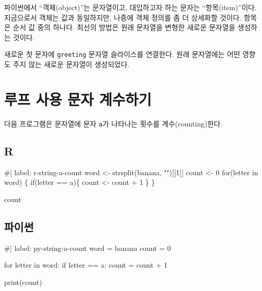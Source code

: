\documentclass[
  letterpaper,
]{book}
\newenvironment{Shaded}{\begin{snugshade}}{\end{snugshade}}
\newcommand{\NormalTok}[1]{\textcolor[rgb]{0.00,0.23,0.31}{#1}}
\begin{document}
파이썬에서 ``객체(object)''는 문자열이고, 대입하고자 하는 문자는
``항목(item)''이다. 지금으로서 객체는 값과 동일하지만, 나중에 객체
정의를 좀 더 상세화할 것이다. 항목은 순서 값 중의 하나다. 최선의 방법은
원래 문자열을 변형한 새로운 문자열을 생성하는 것이다. 
  

새로운 첫 문자에 \texttt{greeting} 문자열 슬라이스를 연결한다. 원래
문자열에는 어떤 영향도 주지 않는 새로운 문자열이 생성되었다.

\section{루프 사용 문자 계수하기}\label{r-string-count}

  

다음 프로그램은 문자열에 문자 \texttt{a}가 나타나는 횟수를
계수(counting)한다.

\subsection{R}

\begin{Shaded}
\begin{Highlighting}[]
\NormalTok{\#| label:  r{-}string{-}a{-}count}
\NormalTok{word \textless{}{-} strsplit(\textquotesingle{}banana\textquotesingle{}, "")[[1]]}
\NormalTok{count \textless{}{-} 0}
\NormalTok{for(letter in word) \{}
\NormalTok{  if(letter == \textquotesingle{}a\textquotesingle{})\{}
\NormalTok{    count \textless{}{-} count + 1}
\NormalTok{  \}}
\NormalTok{\}}

\NormalTok{count}
\end{Highlighting}
\end{Shaded}

\subsection{파이썬}

\begin{Shaded}
\begin{Highlighting}[]
\NormalTok{\#| label: py{-}string{-}a{-}count}
\NormalTok{word = \textquotesingle{}banana\textquotesingle{}}
\NormalTok{count = 0}

\NormalTok{for letter in word:}
\NormalTok{    if letter == \textquotesingle{}a\textquotesingle{}:}
\NormalTok{        count = count + 1}

\NormalTok{print(count)}
\end{Highlighting}
\end{Shaded}
\end{document}
